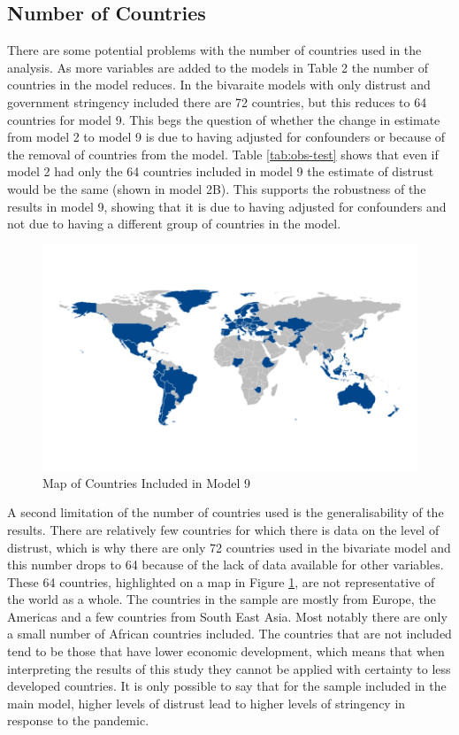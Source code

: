 \documentclass[
  12pt,
]{article}
\begin{document}
\hypertarget{number-of-countries}{%
\subsection{Number of Countries}\label{number-of-countries}}

There are some potential problems with the number of countries used in the analysis. As more variables are added to the models in Table 2 the number of countries in the model reduces. In the bivaraite models with only distrust and government stringency included there are 72 countries, but this reduces to 64 countries for model 9. This begs the question of whether the change in estimate from model 2 to model 9 is due to having adjusted for confounders or because of the removal of countries from the model. Table \ref{tab:obs-test} shows that even if model 2 had only the 64 countries included in model 9 the estimate of distrust would be the same (shown in model 2B). This supports the robustness of the results in model 9, showing that it is due to having adjusted for confounders and not due to having a different group of countries in the model.\\

\begin{figure}
\includegraphics[width=0.8\linewidth]{write_up_test_files/figure-latex/map-1} \caption{Map of Countries Included in Model 9}\label{fig:map}
\end{figure}

A second limitation of the number of countries used is the generalisability of the results. There are relatively few countries for which there is data on the level of distrust, which is why there are only 72 countries used in the bivariate model and this number drops to 64 because of the lack of data available for other variables. These 64 countries, highlighted on a map in Figure \ref{fig:map}, are not representative of the world as a whole. The countries in the sample are mostly from Europe, the Americas and a few countries from South East Asia. Most notably there are only a small number of African countries included. The countries that are not included tend to be those that have lower economic development, which means that when interpreting the results of this study they cannot be applied with certainty to less developed countries. It is only possible to say that for the sample included in the main model, higher levels of distrust lead to higher levels of stringency in response to the pandemic.\\
\end{document}
